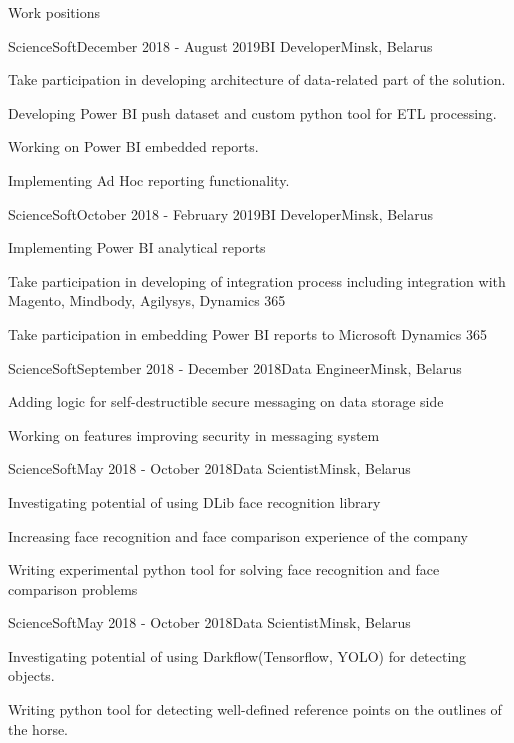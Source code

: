 \documentclass{resume} %
\begin{document}
\begin{rSection}{Work positions}
\begin{rSubsection}{ScienceSoft}{December 2018 - August 2019}{BI Developer}{Minsk, Belarus}
\item Take participation in developing architecture of data-related part of the solution.
\item Developing Power BI push dataset and custom python tool for ETL processing.
\item Working on Power BI embedded reports.
\item Implementing Ad Hoc reporting functionality.
\end{rSubsection}

\begin{rSubsection}{ScienceSoft}{October 2018 - February 2019}{BI Developer}{Minsk, Belarus}
\item Implementing Power BI analytical reports
\item Take participation in developing of integration process including integration with Magento, Mindbody, Agilysys, Dynamics 365
\item Take participation in embedding Power BI reports to Microsoft Dynamics 365
\end{rSubsection}

\begin{rSubsection}{ScienceSoft}{September 2018 - December 2018}{Data Engineer}{Minsk, Belarus}
\item Adding logic for self-destructible secure messaging on data storage side
\item Working on features improving security in messaging system
\end{rSubsection}

\begin{rSubsection}{ScienceSoft}{May 2018 - October 2018}{Data Scientist}{Minsk, Belarus}
\item Investigating potential of using DLib face recognition library
\item Increasing face recognition and face comparison experience of the company
\item Writing experimental python tool for solving face recognition and face comparison problems
\end{rSubsection}

\begin{rSubsection}{ScienceSoft}{May 2018 - October 2018}{Data Scientist}{Minsk, Belarus}
\item Investigating potential of using Darkflow(Tensorflow, YOLO) for detecting objects.
\item Writing python tool for detecting well-defined reference points on the outlines of the horse.
\end{rSubsection}


\end{rSection}
\end{document}
